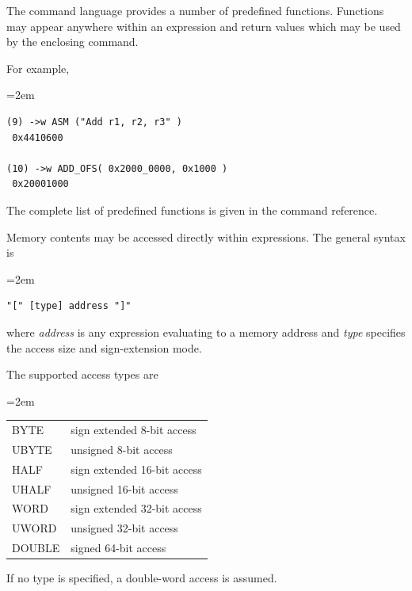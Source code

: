 
The command language provides a number of predefined functions. Functions may appear anywhere within an expression and return values which may be used by the enclosing command.

For example,

\begin{list}{}{\leftmargin=2em}
\item
\begin{verbatim}
(9) ->w ASM ("Add r1, r2, r3" )
 0x4410600
 
(10) ->w ADD_OFS( 0x2000_0000, 0x1000 )
 0x20001000
\end{verbatim}
\end{list}

The complete list of predefined functions is given in the command reference.


Memory contents may be accessed directly within expressions. The general syntax is

\begin{list}{}{\leftmargin=2em}
\item
\begin{verbatim}
"[" [type] address "]"
\end{verbatim}
\end{list}

where \textit{address} is any expression evaluating to a memory address and \textit{type} specifies the access size and sign-extension mode.

The supported access types are

\begin{list}{}{\leftmargin=2em}
\item
\begin{tabular}{ll}
BYTE   & sign extended 8-bit access \\
UBYTE  & unsigned 8-bit access \\
HALF   & sign extended  16-bit access \\
UHALF  & unsigned  16-bit access \\
WORD   & sign extended 32-bit access \\
UWORD  & unsigned 32-bit access \\
DOUBLE & signed 64-bit access
\end{tabular}
\end{list}

If no type is specified, a double-word access is assumed.

